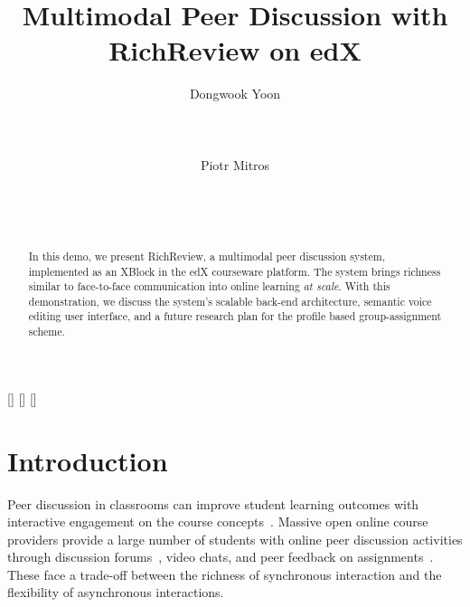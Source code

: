 \documentclass{sigchi}
\begin{document}
\title{Multimodal Peer Discussion with RichReview on edX}

\author{
  \alignauthor Dongwook Yoon\\
    \\
    \\
    \\
  \alignauthor Piotr Mitros\\
    \\
    \\
    \\
}

\maketitle

\begin{abstract}
In this demo, we present RichReview, a multimodal peer discussion system, implemented as an XBlock in the edX courseware platform. The system brings richness similar to face-to-face communication into online learning \emph{at scale}. With this demonstration, we discuss the system's scalable back-end architecture, semantic voice editing user interface, and a future research plan for the profile based group-assignment scheme.
\end{abstract}


[] 
[] 
[] 

\section{Introduction}

Peer discussion in classrooms can improve student learning outcomes with interactive engagement on the course concepts~\cite{chi2014icap}.
Massive open online course providers provide a large number of students with online peer discussion activities through discussion forums~\cite{13Mitros6002}, video chats, and peer feedback on assignments~\cite{linc}. These face a trade-off between the richness of synchronous interaction and the flexibility of asynchronous interactions.
\end{document}
